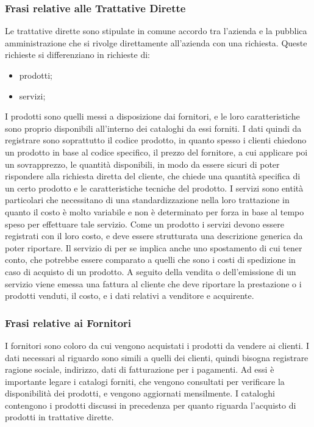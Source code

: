 \subsubsection{Frasi relative alle Trattative Dirette}
Le trattative dirette sono stipulate in comune accordo tra l'azienda e la pubblica amministrazione che si rivolge direttamente all'azienda con una richiesta. Queste richieste si differenziano in richieste di:
\begin{itemize}
\item	prodotti;
\item	servizi;
\end{itemize}
I prodotti sono quelli messi a disposizione dai fornitori, e le loro caratteristiche sono proprio disponibili all'interno dei cataloghi da essi forniti. I dati quindi da registrare sono soprattutto il codice prodotto, in quanto spesso i clienti chiedono un prodotto in base al codice specifico, il prezzo del fornitore, a cui applicare poi un sovrapprezzo, le quantità disponibili, in modo da essere sicuri di poter rispondere alla richiesta diretta del cliente, che chiede una quantità specifica di un certo prodotto e le caratteristiche tecniche del prodotto.\newline
I servizi sono entità particolari che necessitano di una standardizzazione nella loro trattazione in quanto il costo è molto variabile e non è determinato per forza in base al tempo speso per effettuare tale servizio. Come un prodotto i servizi devono essere registrati con il loro costo, e deve essere strutturata una descrizione generica da poter riportare. Il servizio di per se implica anche uno spostamento di cui tener conto, che potrebbe essere comparato a quelli che sono i costi di spedizione in caso di acquisto di un prodotto.
A seguito della vendita o dell'emissione di un servizio viene emessa una fattura al cliente che deve riportare la prestazione o i prodotti venduti, il costo, e i dati relativi a venditore e acquirente.

\subsubsection{Frasi relative ai Fornitori}
I fornitori sono coloro da cui vengono acquistati i prodotti da vendere ai clienti. I dati necessari al riguardo sono simili a quelli dei clienti, quindi bisogna registrare ragione sociale, indirizzo, dati di fatturazione per i pagamenti. Ad essi è importante legare i catalogi forniti, che vengono consultati per verificare la disponibilità dei prodotti, e vengono aggiornati mensilmente. I cataloghi contengono i prodotti discussi in precedenza per quanto riguarda l'acquisto di prodotti in trattative dirette.

